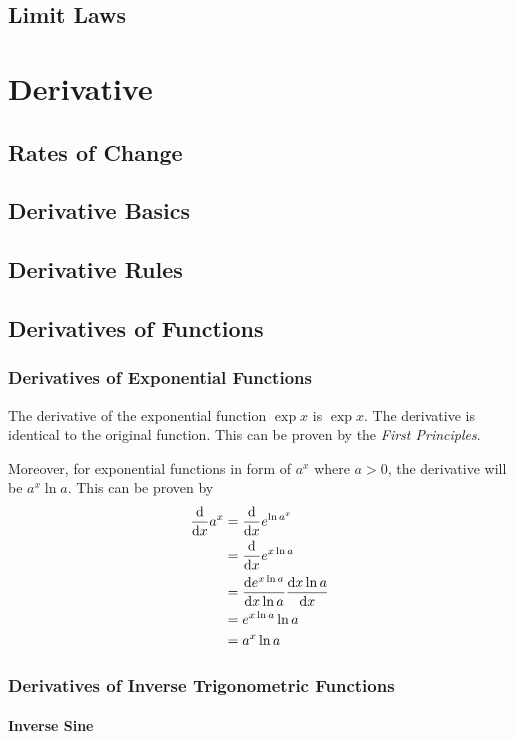\documentclass{note}
\begin{document}
\section{Limit Laws}

\chapter{Derivative}
\section{Rates of Change}
\section{Derivative Basics}
\section{Derivative Rules}
\section{Derivatives of Functions}

\subsection{Derivatives of Exponential Functions}

The derivative of the exponential function $\exp x$ is $\exp x$. The derivative is identical to the original function. This can be proven by the \textit{First Principles}.

Moreover, for exponential functions in form of $a^x$ where $a > 0$, the derivative will be $a^x \ln a$. This can be proven by
\begin{align*}
    \dv{x} a^x
    & = \dv{x} e^{\ln a^x} \\
    & = \dv{x} e^{x \ln a} \\
    & = \dv{e^{x \ln a}}{x \ln a} \dv{x \ln a}{x} \\
    & = e^{x \ln a} \ln a \\
    & = a^x \ln a
\end{align*}

\subsection{Derivatives of Inverse Trigonometric Functions}

\subsubsection{Inverse Sine}
\end{document}
